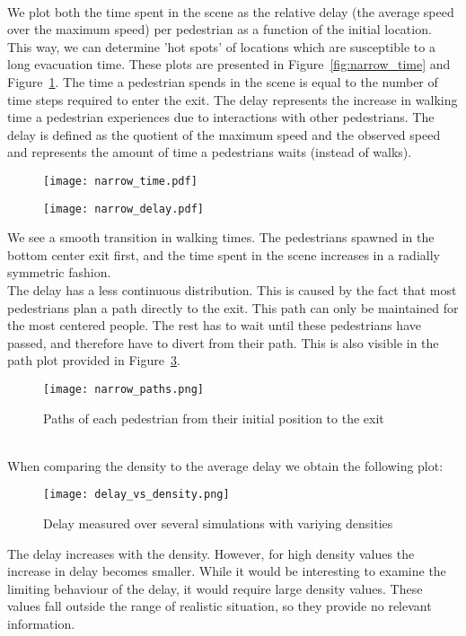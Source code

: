 \documentclass{article}
\begin{document}
\ \\
We plot both the time spent in the scene as the relative delay (the average speed over the maximum speed) per pedestrian as a function of the initial location. 
This way, we can determine 'hot spots' of locations which are susceptible to a long evacuation time. 
These plots are presented in Figure~\ref{fig:narrow_time} and Figure~\ref{fig:narrow_delay}. The time a pedestrian spends in the scene is equal to the number of time steps required to enter the exit. 
The delay represents the increase in walking time a pedestrian experiences due to interactions with other pedestrians. The delay is defined as the quotient of the maximum speed and the observed speed and represents the amount of time a pedestrians waits (instead of walks).
\begin{figure}[h]
\centering
\begin{minipage}{.45\textwidth}
	\centering
	\texttt{[image: narrow\_time.pdf]}
	\label{fig:narrow_time}
\end{minipage}%
\hfill
\begin{minipage}{.45\textwidth}
	\centering
	\texttt{[image: narrow\_delay.pdf]}
	\label{fig:narrow_delay}
\end{minipage}
\end{figure}
We see a smooth transition in walking times. The pedestrians spawned in the bottom center exit first, and the time spent in the scene increases in a radially symmetric fashion.\\
The delay has a less continuous distribution. This is caused by the fact that most pedestrians plan a path directly to the exit. 
This path can only be maintained for the most centered people. The rest has to wait until these pedestrians have passed, and therefore have to divert from their path. This is also visible in the path plot provided in Figure~\ref{fig:narrow_paths}.\\
\begin{figure}[h!]
	\centering
	\texttt{[image: narrow\_paths.png]}
	\caption{Paths of each pedestrian from their initial position to the exit}
	\label{fig:narrow_paths}
\end{figure}\\
When comparing the density to the average delay we obtain the following plot:
\begin{figure}[h!]
    \centering
    \texttt{[image: delay\_vs\_density.png]}
    \caption{Delay measured over several simulations with variying densities}
    \label{fig:narrow_paths}
\end{figure}
The delay increases with the density. However, for high density values the increase in delay becomes smaller. While it would be interesting to examine the limiting behaviour of the delay, it would require large density values. These values fall outside the range of realistic situation, so they provide no relevant information.
\end{document}
